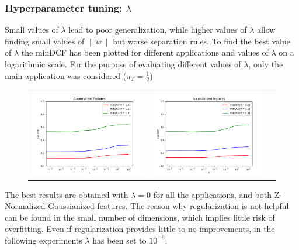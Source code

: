 \documentclass[12pt,a4paper]{article}
\begin{document}
\subsubsection{Hyperparameter tuning: \(\lambda\)}

Small values of \(\lambda\) lead to poor generalization, while higher values of \(\lambda\) allow finding small values of \(\|w\|\) but worse separation rules.
To find the best value of \(\lambda\) the minDCF has been plotted for different applications and values of \(\lambda\) on a logarithmic scale.
For the purpose of evaluating different values of \(\lambda\), only the main application was considered (\(\pi_T = \frac{1}{2}\))

\begin{figure}[H]
    \begin{center}
        \hspace*{-25pt}
        \begin{tabular}{ccc}
            \includegraphics[width = 200pt]{img/evaluation_plots/lambda-lr-z-normalized.png} &
            \includegraphics[width = 200pt]{img/evaluation_plots/lambda-lr-gaussianized.png}   \\
        \end{tabular}
    \end{center}
\end{figure}

The best results are obtained with \(\lambda = 0 \) for all the applications, and both Z-Normalized Gaussianized features.
The reason why regularization is not helpful can be found in the small number of dimensions, which implies little risk of overfitting.
Even if regularization provides little to no improvements, in the following experiments \(\lambda\) has been set to \(10^{-6}\).
\end{document}
